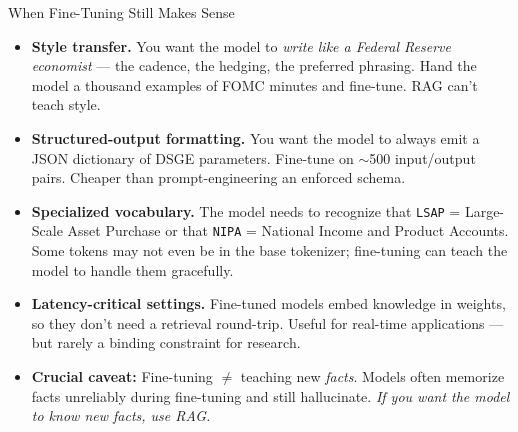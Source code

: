 \documentclass[10pt,english,aspectratio=169]{beamer}
\begin{document}
\begin{frame}{When Fine-Tuning Still Makes Sense}
\begin{itemize}
\item \textbf{Style transfer.} You want the model to \emph{write like a Federal Reserve economist} --- the cadence, the hedging, the preferred phrasing. Hand the model a thousand examples of FOMC minutes and fine-tune. RAG can't teach style.

\medskip
\item \textbf{Structured-output formatting.} You want the model to always emit a JSON dictionary of DSGE parameters. Fine-tune on $\sim$500 input/output pairs. Cheaper than prompt-engineering an enforced schema.

\medskip
\item \textbf{Specialized vocabulary.} The model needs to recognize that \texttt{LSAP} = Large-Scale Asset Purchase or that \texttt{NIPA} = National Income and Product Accounts. Some tokens may not even be in the base tokenizer; fine-tuning can teach the model to handle them gracefully.

\medskip
\item \textbf{Latency-critical settings.} Fine-tuned models embed knowledge in weights, so they don't need a retrieval round-trip. Useful for real-time applications --- but rarely a binding constraint for research.

\medskip
\item \textbf{Crucial caveat:} Fine-tuning $\neq$ teaching new \emph{facts}. Models often memorize facts unreliably during fine-tuning and still hallucinate. \emph{If you want the model to know new facts, use RAG.}
\end{itemize}
\end{frame}
\end{document}
